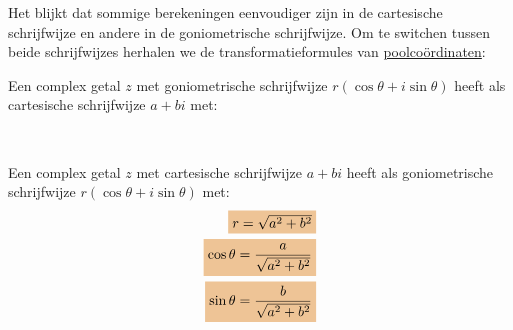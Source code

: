 \documentclass{ximera}
\begin{document}
 
 
Het blijkt dat sommige berekeningen eenvoudiger zijn in de cartesische schrijfwijze en andere in de goniometrische schrijfwijze. Om te switchen tussen beide schrijfwijzes herhalen we de transformatieformules van \hyperref[xim:poolcoordinaten]{poolcoördinaten}:
 
\begin{proposition}\label{eig:transformatie_complexe_getallen} \nl
     
    Een complex getal $z$ met goniometrische schrijfwijze $r(\cos \theta + i\sin\theta)$ heeft als cartesische schrijfwijze $a+bi$ met:
    \begin{center}
        \\
    \end{center}
    Een complex getal $z$ met cartesische schrijfwijze $a+bi$ heeft als goniometrische schrijfwijze $r(\cos \theta + i\sin\theta)$ met:
    \begin{align*}
    \important{r = \sqrt{a^2+b^2}} \\
    \important{\cos\theta  = \dfrac{a}{\sqrt{a^2+b^2}}}\\
    \important{\sin\theta  = \dfrac{b}{\sqrt{a^2+b^2}}}
    \end{align*}
\end{proposition}
 
\end{document}
